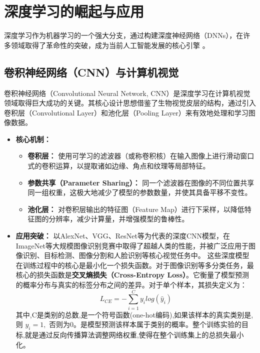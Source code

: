 \section{深度学习的崛起与应用}
\label{sec:dl_rise}
深度学习作为机器学习的一个强大分支，通过构建深度神经网络（DNNs），在许多领域取得了革命性的突破，成为当前人工智能发展的核心引擎 \cite{hussain2022design}。

\subsection{卷积神经网络（CNN）与计算机视觉}
\label{ssec:cnn_cv}
卷积神经网络（Convolutional Neural Network, CNN）是深度学习在计算机视觉领域取得巨大成功的关键。其核心设计思想借鉴了生物视觉皮层的结构，通过引入卷积层（Convolutional Layer）和池化层（Pooling Layer）来有效地处理和学习图像数据。
\begin{itemize}
    \item \textbf{核心机制：}
        \begin{itemize}
            \item \textbf{卷积层：} 使用可学习的滤波器（或称卷积核）在输入图像上进行滑动窗口式的卷积运算，以提取诸如边缘、角点和纹理等局部特征。
            \item \textbf{参数共享（Parameter Sharing）：} 同一个滤波器在图像的不同位置共享同一组权重，这极大地减少了模型的参数数量，并使其具备平移不变性。
            \item \textbf{池化层：} 对卷积层输出的特征图（Feature Map）进行下采样，以降低特征图的分辨率，减少计算量，并增强模型的鲁棒性。
        \end{itemize}
    \item \textbf{应用突破：} 以AlexNet、VGG、ResNet等为代表的深度CNN模型，在ImageNet等大规模图像识别竞赛中取得了超越人类的性能，并被广泛应用于图像识别、目标检测、图像分割和人脸识别等核心视觉任务中。
    这些深度模型在训练过程中的核心是最小化一个损失函数。对于图像识别等多分类任务，最核心的损失函数是\textbf{交叉熵损失（Cross-Entropy Loss）}。它衡量了模型预测的概率分布与真实的标签分布之间的差异。对于单个样本，其损失定义为：
	\[
		L_{CE}=-\sum_{i=1}^{C}y_{i}log(\hat{y}_{i})
	\]
	其中,C是类别的总数,是一个符号函数(one-hot编码),如果该样本的真实类别是,则 $y_{i}=1,$ 否则为0。是模型预测该样本属于类别的概率。整个训练实验的目标,就是通过反向传播算法调整网络权重,使得在整个训练集上的总损失最小化。
\end{itemize}

